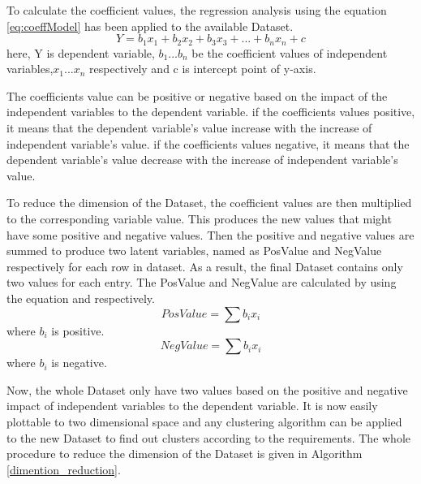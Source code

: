 \documentclass[12pt]{report}
\begin{document}
To calculate the coefficient values, the regression analysis using the equation \ref{eq:coeffModel} has been applied to the available Dataset. 
\begin{equation}
\label{eq:coeffModel}
 Y=b_{1}x_{1}+b_{2}x_{2}+b_{3}x_{3}+...+b_{n}x_{n}+c
\end{equation}
here, Y is dependent variable, $b_{1}$...$b_{n}$ be the coefficient values of independent variables,$x_{1}$...$x{_n}$ respectively and c is intercept point of y-axis. 


The coefficients value can be positive or negative based on the impact of the independent variables to the dependent variable. if the coefficients values positive, it means that the dependent variable's value increase with the increase of independent variable's value. if the coefficients values negative, it means that the dependent variable's value decrease with the increase of independent variable's value. 
 
To reduce the dimension of the Dataset, the coefficient values are then multiplied to the corresponding variable value. This produces the new values that might have some positive and negative values. Then the positive and negative values are summed to produce two latent variables, named as PosValue and NegValue respectively for each row in dataset. As a result, the final Dataset contains only two values for each entry. The PosValue and NegValue are calculated by using the equation \cite{eq:PosValue} and \cite{eq:NegValue} respectively. 
\begin{equation}
\label{eq:PosValue}
 PosValue=\sum{b_{i}x_{i}}
\end{equation} 
where $b_{i}$ is positive.
\begin{equation}
\label{eq:NegValue}
NegValue=\sum{b_{i}x_{i}}
\end{equation}
where $b_{i}$ is negative.

Now, the whole Dataset only have two values based on the positive and negative impact of independent variables to the dependent variable. It is now easily plottable to two dimensional space and any clustering algorithm can be applied to the new Dataset to find out clusters according to the requirements. The whole procedure to reduce the dimension of the Dataset is given in Algorithm \ref{dimention_reduction}.
\end{document}
